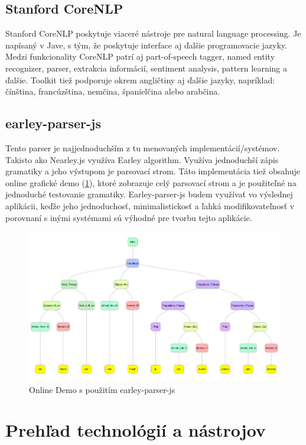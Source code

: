 \documentclass[12pt,a4paper]{report}
\theoremstyle{definition}
\theoremstyle{remark}
\begin{document}
\subsection{Stanford CoreNLP}
Stanford CoreNLP poskytuje viaceré nástroje pre natural language processing. Je napísaný v Jave, s tým, že poskytuje interface aj ďalšie programovacie jazyky. Medzi funkcionality CoreNLP patrí aj part-of-speech tagger, named entity recognizer, parser, extrakcia informácií, sentiment analysis, pattern learning a ďalšie. Toolkit tiež podporuje okrem angličtiny aj ďalšie jazyky, napríklad: čínština, francúzština, nemčina, španielčina alebo arabčina.

\subsection{earley-parser-js}
Tento parser je najjednoduchším z tu menovaných implementácií/systémov. Takisto ako Nearley.js využíva Earley algorithm. Využíva jednoduchší zápis gramatiky a jeho výstupom je parsovací strom. Táto implementácia tiež obsahuje online grafické demo (\ref{fig:demo}), ktoré zobrazuje celý parsovací strom a je použiteľné na jednoduché testovanie gramatiky. Earley-parser-js\cite{earley-oop} budem využívať vo výslednej aplikácii, keďže jeho jednoduchosť, minimalistickosť a ľahká modifikovateľnosť v porovnaní s inými systémami sú výhodné pre tvorbu tejto aplikácie.
\begin{figure}[H]
\includegraphics[scale=0.4]{onlineDemo}
\caption{Online Demo s použitím earley-parser-js}
  \label{fig:demo}
\end{figure}

\section{Prehľad technológií a nástrojov}
\end{document}
